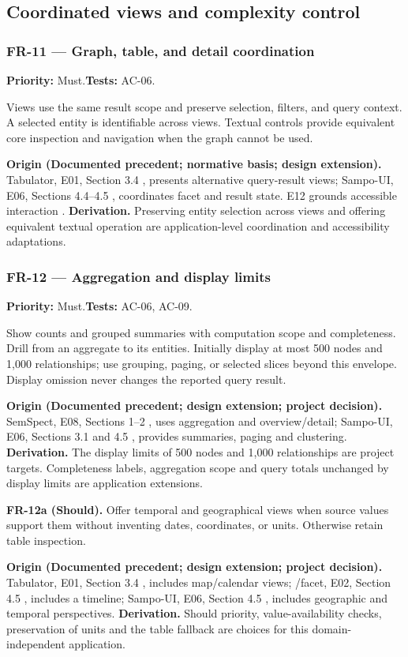 \documentclass[11pt,a4paper]{article}
\newcommand{\req}[4]{\subsubsection*{#1 --- #2}\phantomsection\label{req:#1}\textbf{Priority:} #3.\quad\textbf{Tests:} #4.\par}
\newcommand{\origin}[3]{\par{\small\textbf{Origin (#1).} #2 \textbf{Derivation.} #3\par}}
\begin{document}
\subsection{Coordinated views and complexity control}
\par\noindent\begin{minipage}{\linewidth}
\req{FR-11}{Graph, table, and detail coordination}{Must}{AC-06}
Views use the same result scope and preserve selection, filters, and query context. A selected entity is identifiable across views. Textual controls provide equivalent core inspection and navigation when the graph cannot be used.
\origin{Documented precedent; normative basis; design extension}{Tabulator, E01, Section 3.4 \citep{tabulator}, presents alternative query-result views; Sampo-UI, E06, Sections 4.4--4.5 \citep{sampoui}, coordinates facet and result state. E12 grounds accessible interaction \citep{wcag}.}{Preserving entity selection across views and offering equivalent textual operation are application-level coordination and accessibility adaptations.}
\end{minipage}\par
\par\noindent\begin{minipage}{\linewidth}
\req{FR-12}{Aggregation and display limits}{Must}{AC-06, AC-09}
Show counts and grouped summaries with computation scope and completeness. Drill from an aggregate to its entities. Initially display at most 500 nodes and 1,000 relationships; use grouping, paging, or selected slices beyond this envelope. Display omission never changes the reported query result.
\origin{Documented precedent; design extension; project decision}{SemSpect, E08, Sections 1--2 \citep{semspect}, uses aggregation and overview/detail; Sampo-UI, E06, Sections 3.1 and 4.5 \citep{sampoui}, provides summaries, paging and clustering.}{The display limits of 500 nodes and 1,000 relationships are project targets. Completeness labels, aggregation scope and query totals unchanged by display limits are application extensions.}
\end{minipage}\par
\par\noindent\begin{minipage}{\linewidth}
\textbf{FR-12a (Should).} Offer temporal and geographical views when source values support them without inventing dates, coordinates, or units. Otherwise retain table inspection.
\origin{Documented precedent; design extension; project decision}{Tabulator, E01, Section 3.4 \citep{tabulator}, includes map/calendar views; /facet, E02, Section 4.5 \citep{facet}, includes a timeline; Sampo-UI, E06, Section 4.5 \citep{sampoui}, includes geographic and temporal perspectives.}{Should priority, value-availability checks, preservation of units and the table fallback are choices for this domain-independent application.}
\end{minipage}\par
\end{document}
